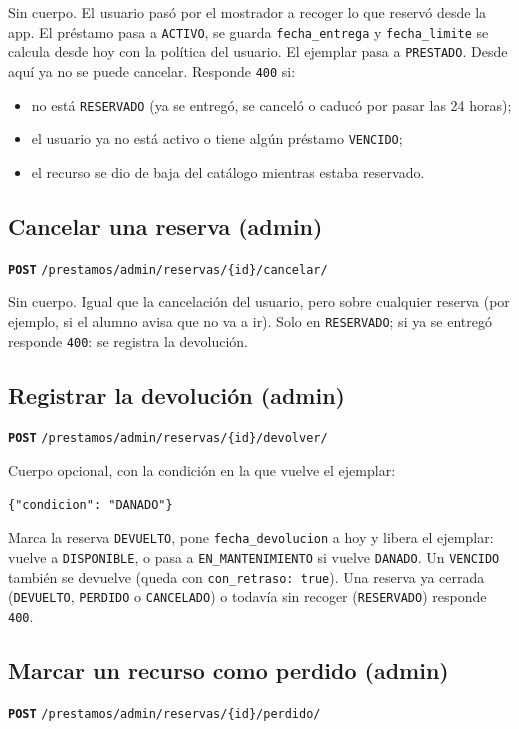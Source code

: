 \documentclass[11pt]{article}
\newcommand{\us}{\_\allowbreak}
\newcommand{\metodo}[2]{\textbf{\texttt{#1}} \texttt{#2}}
\begin{document}
Sin cuerpo. El usuario pas\'o por el mostrador a recoger lo que reserv\'o desde la app. El pr\'estamo pasa a \texttt{ACTIVO}, se guarda \texttt{fecha\us entrega} y \texttt{fecha\us limite} se calcula desde hoy con la pol\'itica del usuario. El ejemplar pasa a \texttt{PRESTADO}. Desde aqu\'i ya no se puede cancelar. Responde \texttt{400} si:
\begin{itemize}
    \item no est\'a \texttt{RESERVADO} (ya se entreg\'o, se cancel\'o o caduc\'o por pasar las 24 horas);
    \item el usuario ya no est\'a activo o tiene alg\'un pr\'estamo \texttt{VENCIDO};
    \item el recurso se dio de baja del cat\'alogo mientras estaba reservado.
\end{itemize}

\subsection*{Cancelar una reserva (admin)}
\metodo{POST}{/prestamos/admin/reservas/\{id\}/cancelar/}

Sin cuerpo. Igual que la cancelaci\'on del usuario, pero sobre cualquier reserva (por ejemplo, si el alumno avisa que no va a ir). Solo en \texttt{RESERVADO}; si ya se entreg\'o responde \texttt{400}: se registra la devoluci\'on.

\subsection*{Registrar la devoluci\'on (admin)}
\metodo{POST}{/prestamos/admin/reservas/\{id\}/devolver/}

Cuerpo opcional, con la condici\'on en la que vuelve el ejemplar:
\begin{lstlisting}
{"condicion": "DANADO"}
\end{lstlisting}
Marca la reserva \texttt{DEVUELTO}, pone \texttt{fecha\us devolucion} a hoy y libera el ejemplar: vuelve a \texttt{DISPONIBLE}, o pasa a \texttt{EN\us MANTENIMIENTO} si vuelve \texttt{DANADO}. Un \texttt{VENCIDO} tambi\'en se devuelve (queda con \texttt{con\us retraso: true}). Una reserva ya cerrada (\texttt{DEVUELTO}, \texttt{PERDIDO} o \texttt{CANCELADO}) o todav\'ia sin recoger (\texttt{RESERVADO}) responde \texttt{400}.

\subsection*{Marcar un recurso como perdido (admin)}
\metodo{POST}{/prestamos/admin/reservas/\{id\}/perdido/}
\end{document}
